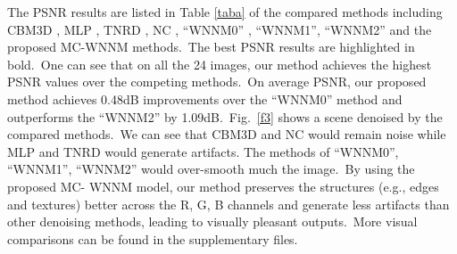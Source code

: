 \documentclass[10pt,twocolumn,letterpaper,sort&compress]{article}
\begin{document}
The PSNR results are listed in Table \ref{taba} of the compared methods including CBM3D \cite{cbm3d}, MLP \cite{mlp}, TNRD \cite{chen2015learning}, NC \cite{noiseclinic,ncwebsite}, ``WNNM0'' \cite{wnnmijcv}, ``WNNM1'', ``WNNM2'' and the proposed MC-WNNM methods.\ The best PSNR results are highlighted in bold.\ One can see that on all the 24 images, our method achieves the highest PSNR values over the competing methods.\ On average PSNR, our proposed method achieves 0.48dB improvements over the ``WNNM0'' method and outperforms the ``WNNM2'' by 1.09dB.\ Fig.\ \ref{f3} shows a scene denoised by the compared methods.\ We can see that CBM3D and NC would remain noise while MLP and TNRD would generate artifacts. The methods of ``WNNM0'', ``WNNM1'', ``WNNM2'' would over-smooth much the image.\ By using the proposed MC- WNNM model, our method preserves the structures (e.g., edges and textures) better across the R, G, B channels and generate less artifacts than other denoising methods, leading to visually pleasant outputs.\ More visual comparisons can be found in the supplementary files.
\end{document}
